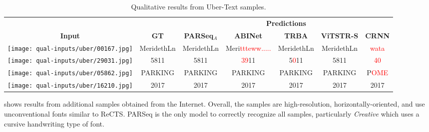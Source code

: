 \begin{table*}[htb]
  \centering
  \setlength\tabcolsep{4pt}
  \scriptsize
  \caption{Qualitative results from Uber-Text samples.}
  \begin{tabular}{ c c c c c c c }
    \toprule
    & & \multicolumn{5}{c}{\textbf{Predictions}} \\
    \cmidrule{3-7}
    \textbf{Input} & \textbf{GT} & \textbf{PARSeq$_A$} & \textbf{ABINet} & \textbf{TRBA} & \textbf{ViTSTR-S} & \textbf{CRNN} \\
    \midrule
    \texttt{[image: qual-inputs/uber/00167.jpg]} & MeridethLn & MeridethLn & Meri\textcolor{red}{ttteww.....} & MeridethLn & MeridethLn & \textcolor{red}{wata} \\
    \texttt{[image: qual-inputs/uber/29031.jpg]} & 5811 & 5811 & \textcolor{red}{39}11 & 5\textcolor{red}{0}11 & 5811 & \textcolor{red}{40} \\
    \texttt{[image: qual-inputs/uber/05862.jpg]} & PARKING & PARKING & PARKING & PARKING & PARKING & P\textcolor{red}{OME} \\
    \texttt{[image: qual-inputs/uber/16210.jpg]} & 2017 & 2017 & 2017 & 2017 & 2017 & 2017 \\
\bottomrule
  \end{tabular}
  \label{tab:qual-results-uber}
\end{table*}

 shows results from additional samples obtained from the Internet. Overall, the samples are high-resolution, horizontally-oriented, and use unconventional fonts similar to ReCTS. PARSeq is the only model to correctly recognize all samples, particularly \textit{Creative} which uses a cursive handwriting type of font.

